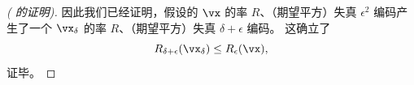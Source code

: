\documentclass[../../book-main_zh.tex]{subfiles}
\begin{document}
\begin{proof}[( 的证明)]
    因此我们已经证明，假设的 $\vx$ 的率 $R$、（期望平方）失真 $\epsilon^2$ 编码产生了一个 $\vx_{\delta}$ 的率 $R$、（期望平方）失真 $\delta + \epsilon$ 编码。
    这确立了
    \begin{equation}
        R_{\delta + \epsilon}(\vx_{\delta})
        \leq
        R_{\epsilon}(\vx),
    \end{equation}
    证毕。

\end{proof}
\end{document}
